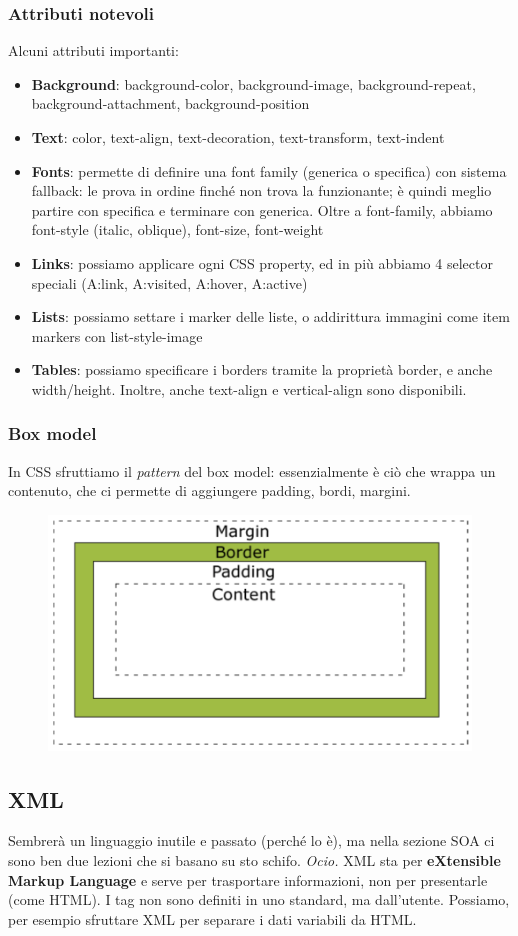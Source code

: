 \documentclass[11pt]{article}
\begin{document}
\subsubsection{Attributi notevoli}
Alcuni attributi importanti:
\begin{itemize}
    \item \textbf{Background}: background-color, background-image, background-repeat, background-attachment, background-position
    \item \textbf{Text}: color, text-align, text-decoration, text-transform, text-indent
    \item \textbf{Fonts}: permette di definire una font family (generica o specifica) con sistema fallback: le prova in ordine finché non trova la funzionante; è quindi meglio partire con specifica e terminare con generica. Oltre a font-family, abbiamo font-style (italic, oblique), font-size, font-weight
    \item \textbf{Links}: possiamo applicare ogni CSS property, ed in più abbiamo 4 selector speciali (A:link, A:visited, A:hover, A:active)
    \item \textbf{Lists}: possiamo settare i marker delle liste, o addirittura immagini come item markers con list-style-image 
    \item \textbf{Tables}: possiamo specificare i borders tramite la proprietà border, e anche width/height. Inoltre, anche text-align e vertical-align sono disponibili.
\end{itemize}

\subsubsection{Box model}
In CSS sfruttiamo il \textit{pattern} del box model: essenzialmente è ciò che wrappa un contenuto, che ci permette di aggiungere padding, bordi, margini. 
\begin{figure}[H]
    \centering
    \includegraphics[width=0.6\linewidth]{res/boxmodel.png}
\end{figure}
\subsection{XML}
Sembrerà un linguaggio inutile e passato (perché lo è), ma nella sezione SOA ci sono ben due lezioni che si basano su sto schifo. \textit{Ocio.} XML sta per \textbf{eXtensible Markup Language} e serve per trasportare informazioni, non per presentarle (come HTML). I tag non sono definiti in uno standard, ma dall'utente. Possiamo, per esempio sfruttare XML per separare i dati variabili da HTML. 
\end{document}
